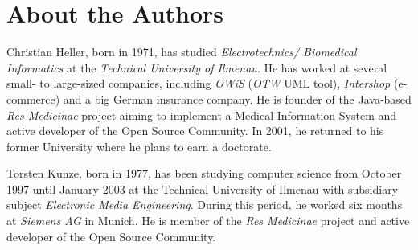 \section{About the Authors}
\label{about_the_authors_section}

Christian Heller, born in 1971, has studied \emph{Electrotechnics/ Biomedical Informatics}
at the \emph{Technical University of Ilmenau}. He has worked at several small-
to large-sized companies, including \emph{OWiS} (\emph{OTW} UML tool), \emph{Intershop}
(e-commerce) and a big German insurance company. He is founder of the Java-based
\emph{Res Medicinae} project aiming to implement a Medical Information System
and active developer of the Open Source Community. In 2001, he returned to his
former University where he plans to earn a doctorate.

Torsten Kunze, born in 1977, has been studying computer science from October 1997
until January 2003 at the Technical University of Ilmenau with subsidiary subject
\emph{Electronic Media Engineering}. During this period, he worked six months at
\emph{Siemens AG} in Munich. He is member of the \emph{Res Medicinae} project
and active developer of the Open Source Community.

